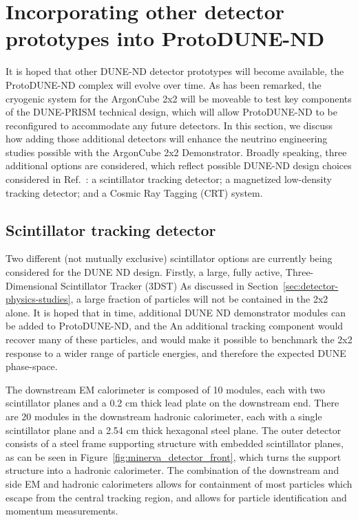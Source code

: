 \section{Incorporating other detector prototypes into ProtoDUNE-ND}
\label{sec:MINERvA_MINOS}

It is hoped that other DUNE-ND detector prototypes will become available, the ProtoDUNE-ND complex will evolve over time. As has been remarked, the cryogenic system for the ArgonCube 2x2 will be moveable to test key components of the DUNE-PRISM technical design, which will allow ProtoDUNE-ND to be reconfigured to accommodate any future detectors. In this section, we discuss how adding those additional detectors will enhance the neutrino engineering studies possible with the ArgonCube 2x2 Demonstrator. Broadly speaking, three additional options are considered, which reflect possible DUNE-ND design choices considered in Ref.~\cite{dune_ndcsg}: a scintillator tracking detector; a magnetized low-density tracking detector; and a Cosmic Ray Tagging (CRT) system.

\subsection{Scintillator tracking detector}
\label{sec:minerva}
Two different (not mutually exclusive) scintillator options are currently being considered for the DUNE ND design. Firstly, a large, fully active, Three-Dimensional Scintillator Tracker (3DST)
As discussed in Section~\ref{sec:detector-physics-studies}, a large fraction of particles will not be contained in the 2x2 alone. It is hoped that in time, additional DUNE ND demonstrator modules can be added to ProtoDUNE-ND, and the An additional tracking component would recover many of these particles, and would make it possible to benchmark the 2x2 response to a wider range of particle energies, and therefore the expected DUNE phase-space.


The downstream EM calorimeter is composed of 10 modules, each with two scintillator planes and a 0.2 cm thick lead plate on the downstream end. There are 20 modules in the downstream hadronic calorimeter, each with a single scintillator plane and a 2.54 cm thick hexagonal steel plane. The outer detector consists of a steel frame supporting structure with embedded scintillator planes, as can be seen in Figure~\ref{fig:minerva_detector_front}, which turns the support structure into a hadronic calorimeter. The combination of the downstream and side EM and hadronic calorimeters allows for containment of most particles which escape from the central tracking region, and allows for particle identification and momentum measurements.

